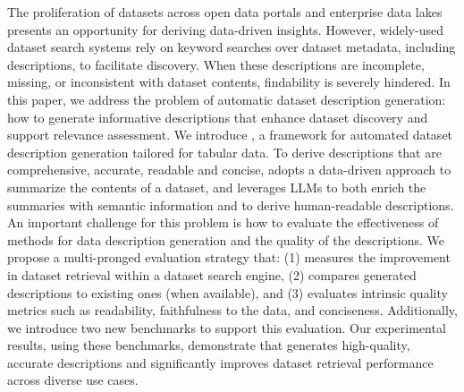 The proliferation of datasets across open data portals and enterprise data lakes presents an opportunity for deriving data-driven insights. However, widely-used dataset search systems rely on keyword searches over dataset metadata, including descriptions, to facilitate discovery. When these descriptions are incomplete, missing, or inconsistent with dataset contents, findability is severely hindered. In this paper, we address the problem of automatic dataset description generation: how to generate informative descriptions that enhance dataset discovery and support relevance assessment.
% 
We introduce \SystemName, a framework for automated dataset description generation tailored for tabular data. To derive descriptions that are comprehensive, accurate, readable and concise, \SystemName adopts a data-driven approach to summarize the contents of a dataset, and leverages LLMs to both enrich the summaries with semantic information and to derive human-readable descriptions. 
%
An important challenge for this problem is how to evaluate the effectiveness of methods for data description generation and the quality of the descriptions. We propose a multi-pronged evaluation strategy that:
%
(1) measures the improvement in dataset retrieval within a dataset search engine, (2) compares generated descriptions to existing ones (when available), and (3) evaluates intrinsic quality metrics such as readability, faithfulness to the data, and conciseness. Additionally, we introduce two new benchmarks to support this evaluation. 
% 
Our experimental results, using these benchmarks, demonstrate that \SystemName generates high-quality, accurate descriptions and significantly improves dataset retrieval performance across diverse use cases. 
